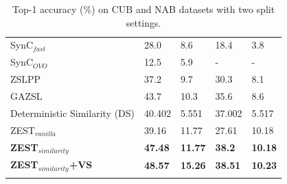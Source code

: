 \documentclass[11pt,a4paper]{article}
\begin{document}
\begin{table}[t]
{\begin{tabular}{l|ll|ll}
SynC$_{fast}$ \citet{changpinyo2016synthesized}     & 28.0                              & 8.6                                & 18.4                              & 3.8                                \\
SynC$_{OVO}$ \citet{changpinyo2016synthesized}      & 12.5                              & 5.9                                & -                                 & -                                  \\
ZSLPP \citet{elhoseiny2017link}                   & 37.2                              & 9.7                                & 30.3                              & 8.1                                \\
GAZSL \citet{zhu2018generative}                   & 43.7                              & 10.3                               & 35.6                              & 8.6                                \\ 
\hline
Deterministic Similarity (DS) & 40.402                            & 5.551                              & 37.002                            & 5.517                              \\
ZEST$_{vanilla}$                                                                 & 39.16                            & 11.77                             & 27.61                            & 10.18                             \\
\textbf{ZEST$_{similarity}$}                                           & \textbf{47.48}                   & \textbf{11.77}                     & \textbf{38.2}                   & \textbf{10.18}                    \\
\hline
\textbf{ZEST$_{similarity}$+VS}                                        & \textbf{48.57}                    & \textbf{15.26}                    & \textbf{38.51 }                   & \textbf{10.23 }                    \\ 
\Xhline{6\arrayrulewidth}
                 
\end{tabular}
}
\caption{Top-1 accuracy (\%) on CUB and NAB datasets with two split settings.}
\label{tab:results}
\end{table}
\end{document}
